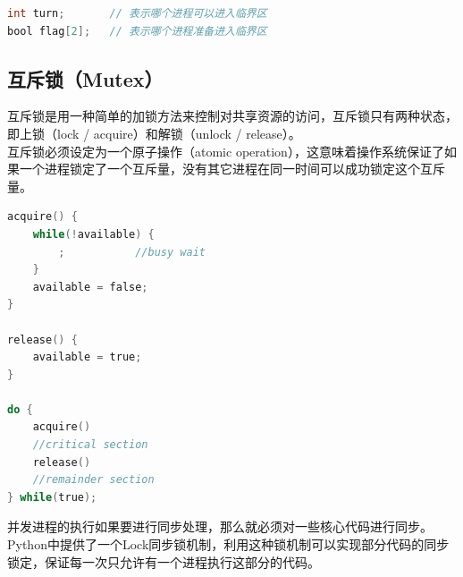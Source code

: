
\begin{lstlisting}[language=C]
int turn;		// 表示哪个进程可以进入临界区
bool flag[2];	// 表示哪个进程准备进入临界区
\end{lstlisting}

\vspace{0.5cm}

\subsection{互斥锁（Mutex）}

互斥锁是用一种简单的加锁方法来控制对共享资源的访问，互斥锁只有两种状态，即上锁（lock / acquire）和解锁（unlock / release）。\\

互斥锁必须设定为一个原子操作（atomic operation），这意味着操作系统保证了如果一个进程锁定了一个互斥量，没有其它进程在同一时间可以成功锁定这个互斥量。\\


\begin{lstlisting}[language=C]
acquire() {
	while(!available) {
		;			//busy wait
	}
	available = false;
}

release() {
	available = true;
}

do {
	acquire()
	//critical section
	release()
	//remainder section
} while(true);
\end{lstlisting}

并发进程的执行如果要进行同步处理，那么就必须对一些核心代码进行同步。Python中提供了一个Lock同步锁机制，利用这种锁机制可以实现部分代码的同步锁定，保证每一次只允许有一个进程执行这部分的代码。\\


